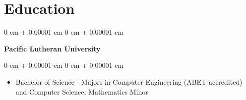 \documentclass[10pt, letterpaper]{article}
\newenvironment{highlights}{
    \begin{itemize}[
        topsep=0.10 cm,
        parsep=0.10 cm,
        partopsep=0pt,
        itemsep=0pt,
        leftmargin=0 cm + 10pt
    ]
}{
    \end{itemize}
} %
\newenvironment{onecolentry}{
    \begin{adjustwidth}{
        0 cm + 0.00001 cm
    }{
        0 cm + 0.00001 cm
    }
}{
    \end{adjustwidth}
} %
\newenvironment{twocolentry}[2][]{
    \onecolentry
    \def\secondColumn{#2}
    \setcolumnwidth{\fill, 4.5 cm}
    \begin{paracol}{2}
}{
    \switchcolumn \raggedleft \secondColumn
    \end{paracol}
    \endonecolentry
} %
\begin{document}
    
    \section{Education}

        \begin{twocolentry}{
            
        }
            \textbf{Pacific Lutheran University}
        \end{twocolentry}

        \vspace{0.10 cm}
        \begin{onecolentry}
            \begin{highlights}
                \item Bachelor of Science - Majors in Computer Engineering (ABET accredited) and Computer Science, Mathematics Minor
            \end{highlights}
        \end{onecolentry}
\end{document}
